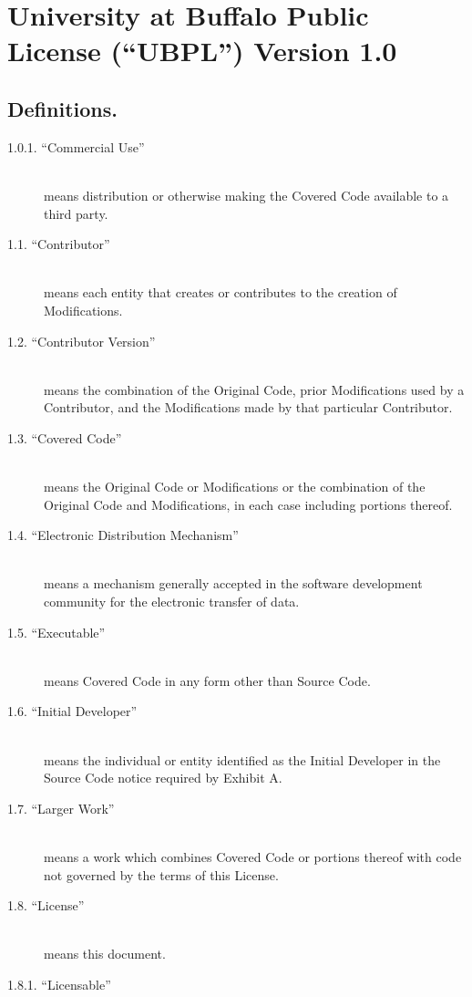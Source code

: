 \documentclass{book}
\begin{document}
\chapter{University at Buffalo Public License (``UBPL'') Version 1.0}
\renewcommand{\thesection}{\arabic{section}.}
\renewcommand{\thesubsection}{\arabic{section}.\arabic{subsection}.}
\setcounter{section}{0}
\section{Definitions.}
\begin{description}
\item [1.0.1. ``Commercial Use'']\mbox{}\\
means distribution or otherwise making the Covered Code available to a third party. 
\item [1.1. ``Contributor'']\mbox{}\\
means each entity that creates or contributes to the creation of Modifications. 
\item [1.2. ``Contributor Version'']\mbox{}\\
means the combination of the Original Code, prior Modifications used by a Contributor, and the Modifications made by that particular Contributor. 
\item [1.3. ``Covered Code'']\mbox{}\\
means the Original Code or Modifications or the combination of the Original Code and Modifications, in each case including portions thereof. 
\item [1.4. ``Electronic Distribution Mechanism'']\mbox{}\\
means a mechanism generally accepted in the software development community for the electronic transfer of data. 
\item [1.5. ``Executable'']\mbox{}\\
means Covered Code in any form other than Source Code. 
\item [1.6. ``Initial Developer'']\mbox{}\\
means the individual or entity identified as the Initial Developer in the Source Code notice required by Exhibit A. 
\item [1.7. ``Larger Work'']\mbox{}\\
means a work which combines Covered Code or portions thereof with code not governed by the terms of this License. 
\item [1.8. ``License'']\mbox{}\\
means this document. 
\item [1.8.1. ``Licensable'']\mbox{}\\

\end{description}
\end{document}

